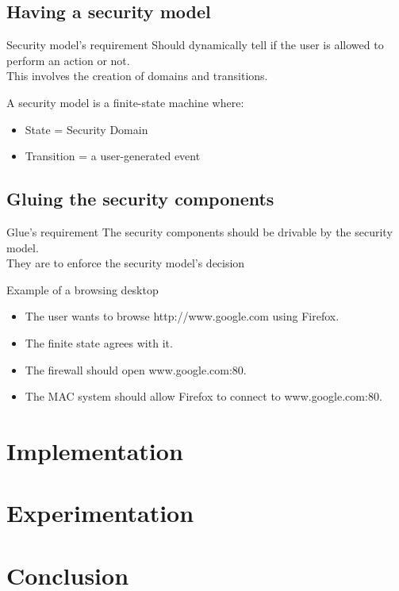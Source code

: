 \documentclass{beamer}
\begin{document}
		\subsection*{Having a security model}
			\begin{frame}
				\begin{block}{Security model's requirement}
					Should dynamically tell if the user is allowed to perform an action or not.\\
					This involves the creation of domains and transitions.
				\end{block}

				\begin{block}{}
					A security model is a finite-state machine where:
					\begin{itemize}
						\item State = Security Domain
						\item Transition = a user-generated event
					\end{itemize}
				\end{block}
			\end{frame}

		\subsection*{Gluing the security components}
			\begin{frame}
				\begin{block}{Glue's requirement}
					The security components should be drivable by the security model.\\
					They are to enforce the security model's decision
				\end{block}

				\begin{block}{Example of a browsing desktop}
					\begin{itemize}
						\item The user wants to browse http://www.google.com using Firefox.
						\item The finite state agrees with it.
						\item The firewall should open www.google.com:80.
						\item The MAC system should allow Firefox to connect to www.google.com:80.
					\end{itemize}
				\end{block}
			\end{frame}

	\section{Implementation}

	\section{Experimentation}

	\section{Conclusion}
\end{document}
